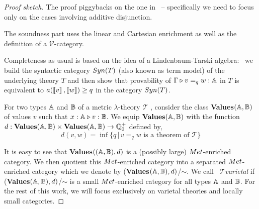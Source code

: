 \documentclass[a4paper,UKenglish,cleveref, autoref, thm-restate]{lipics-v2021}
\begin{document}
\begin{proof}[Proof sketch]
        The proof piggybacks on the one
        in~\cite{dahlqvist22,dahlqvist2023syntactic} -- specifically we need to
        focus only on the cases involving additive disjunction.

        The soundness part uses the linear and Cartesian enrichment as well as
        the definition of a $\mathcal{V}$-category.

        Completeness as usual is based on the idea of a Lindenbaum-Tarski
        algebra: \ie\ we build the syntactic category $\catfont{Syn}(T)$ (also
        known as term model) of the underlying  theory $T$ and then show that
        provability of $\Gamma \triangleright v =_q w : \mathbb{A}$ in $T$ is equivalent to
        $a(\left \llbracket v \right \rrbracket,\left \llbracket w \right \rrbracket) \geq q$ in the category $\catfont{Syn}(T)$.


        For two types $\mathbb{A}$ and $\mathbb{B}$ of a metric
        $\lambda$-theory $\mathscr{T}$ , consider the class
        \textbf{Values}$(\mathbb{A},\mathbb{B})$ of values $v$ such that $x : \mathbb{A}
        \triangleright v : \mathbb{B}$. We equip $\textbf{Values}(\mathbb{A},\mathbb{B})$ with the
        function $d :\textbf{Values}(\mathbb{A},\mathbb{B}) \times
        \textbf{Values}(\mathbb{A},\mathbb{B}) \rightarrow \mathbb{Q}^{+}_0$ defined
        by, $$d(v,w)=\inf{\{q \, \vert \, v=_q w \text{ is a theorem of }
        \mathscr{T} \}}$$

        It is easy to see that \textbf{Values}$((\mathbb{A},\mathbb{B}),d)$ is a
        (possibly large)  $\catMet$-enriched category. We then quotient this
        $\catMet$-enriched category into a separated  $\catMet$-enriched
        category which we denote by
        (\textbf{Values}$(\mathbb{A},\mathbb{B}),d)$/$\sim$. We call  $\mathscr{T}
        $\emph{varietal} if (\textbf{Values}$(\mathbb{A},\mathbb{B}),d)$/$\sim$ is a
        small  $\catMet$-enriched category for all types $\mathbb{A}$ and $\mathbb{B}$.
        For the rest of this work, we will focus exclusively on varietal
        theories and locally small categories.


\end{proof}
\end{document}
